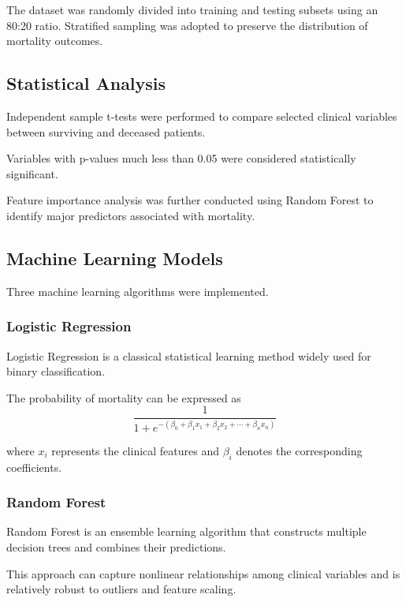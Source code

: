 \documentclass[twocolumn]{article}
\begin{document}
The dataset was randomly divided into training and testing subsets using an 80:20 ratio. Stratified sampling was adopted to preserve the distribution of mortality outcomes.

\subsection{Statistical Analysis}

Independent sample t-tests were performed to compare selected clinical variables between surviving and deceased patients.

Variables with p-values much less than 0.05 were considered statistically significant.

Feature importance analysis was further conducted using Random Forest to identify major predictors associated with mortality.

\subsection{Machine Learning Models}

Three machine learning algorithms were implemented.

\subsubsection{Logistic Regression}

Logistic Regression is a classical statistical learning method widely used for binary classification.

The probability of mortality can be expressed as
\begin{equation}
    \frac{1}{1+e^{-(\beta_0+\beta_1x_1+\beta_2x_2+\cdots+\beta_nx_n)}}
\end{equation}


where $x_i$ represents the clinical features and $\beta_i$ denotes the corresponding coefficients.

\subsubsection{Random Forest}

Random Forest is an ensemble learning algorithm that constructs multiple decision trees and combines their predictions.\cite{hastie2001}

This approach can capture nonlinear relationships among clinical variables and is relatively robust to outliers and feature scaling.
\end{document}

